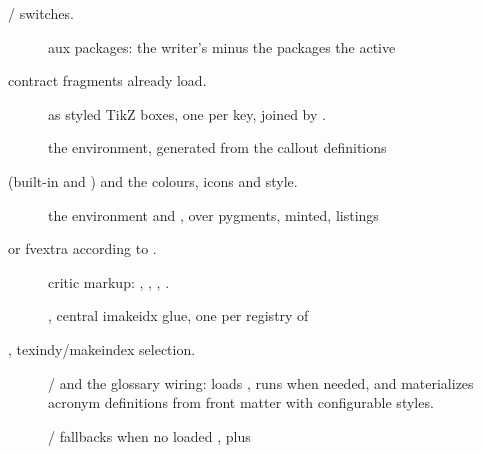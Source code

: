 \documentclass[a4paper,twoside]{article}
\begin{document}
 /  switches.
\begin{description}
\item[{}] aux packages: the writer's  minus the packages the active
\end{description}
contract fragments already load.
\begin{description}
\item[{}]  as styled TikZ boxes, one per key, joined by \tscodeinline{+}.
\item[{}] the  environment, generated from the callout definitions
\end{description}
(built-in and ) and the  colours,
icons and style.
\begin{description}
\item[{}] the  environment and , over pygments, minted, listings
\end{description}
or fvextra according to .
\begin{description}
\item[{}] critic markup: , , , .
\item[{}] , central imakeidx glue, one  per registry of
\end{description}
, texindy/makeindex selection.
\begin{description}
\item[{}]  /  and the glossary wiring: loads , runs  when needed, and materializes acronym definitions from front matter with configurable styles.
\item[{}]  /  fallbacks when no  loaded , plus
\end{description}
\end{document}
